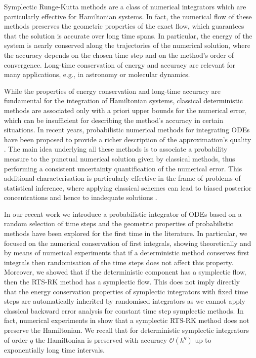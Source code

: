 \documentclass{siamart1116}
\numberwithin{theorem}{section}
\newcommand{\OO}{\mathcal{O}}
\newcommand{\corr}[1]{{\color{red}#1}}
\begin{document}
Symplectic Runge-Kutta methods are a class of numerical integrators which are particularly effective for Hamiltonian systems. In fact, the numerical flow of these methods preserves the geometric properties of the exact flow, which guarantees that the solution is accurate over long time spans. In particular, the energy of the system is nearly conserved along the trajectories of the numerical solution, where the accuracy depends on the chosen time step and on the method's order of convergence. Long-time conservation of energy and accuracy are relevant \corr{for many applications, e.g., in astronomy or molecular dynamics}.

While the properties of energy conservation and long-time accuracy are fundamental for the integration of Hamiltonian systems, classical deterministic methods are associated only with a priori upper bounds for the numerical error, which can be insufficient for describing the method's accuracy \corr{in certain situations}. In recent years, probabilistic numerical methods for integrating ODEs have been proposed  to provide a richer description of the approximation's quality \cite{AbG18, CGS16, KeH16, CCC16, SSH18}. The main idea underlying all these methods is to associate a probability measure to the punctual numerical solution given by classical methods, thus performing a consistent uncertainty quantification of the numerical error. This additional characterisation is particularly effective in the frame of problems of statistical inference, where applying classical schemes can lead to biased posterior concentrations and hence to inadequate solutions \cite{AbG18, CGS16, COS17}.

In our recent work \cite{AbG18} we introduce a probabilistic integrator of ODEs based on a random selection of time steps \corr{and} the geometric properties of probabilistic methods have been explored for the first time in \corr{the} literature. In particular, we focused on the numerical conservation of first integrals, showing theoretically and by means of numerical experiments that if a deterministic method conserves first integrals then randomisation of the time steps does not affect this property. Moreover, we showed that if the deterministic component has a symplectic flow, then the RTS-RK method has a symplectic flow. This does not imply directly that the energy conservation properties of symplectic integrators with fixed time steps are automatically inherited by randomised integrators \corr{as we cannot apply classical backward error analysis for constant time step symplectic methods. In fact, numerical experiments in \cite{AbG18} show that a symplectic RTS-RK method does not preserve the Hamiltonian. We recall that for deterministic symplectic integrators of order $q$ the Hamiltonian is preserved with accuracy $\OO(h^q)$ up to exponentially long time intervals.}
\end{document}
